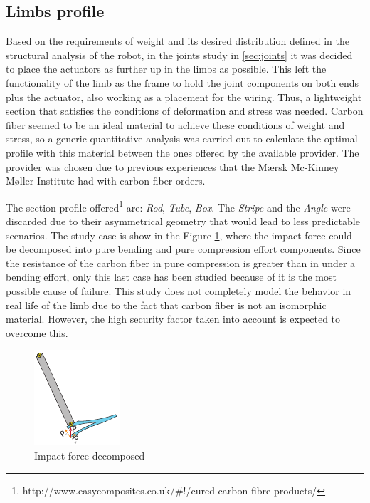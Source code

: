 \subsection{Limbs profile} %
\label{sub:limb_profile}
Based on the requirements of weight and its desired distribution defined in the structural analysis of the robot, in the joints study in \ref{sec:joints} it was decided to place the actuators as further up in the limbs as possible.
This left the functionality of the limb as the frame to hold the joint components on both ends plus the actuator, also working as a placement for the wiring.
Thus, a lightweight section that satisfies the conditions of deformation and stress was needed.
Carbon fiber seemed to be an ideal material to achieve these conditions of weight and stress, so a generic quantitative analysis was carried out to calculate the optimal profile with this material between the ones offered by the available provider.
The provider was chosen due to previous experiences that the Mærsk Mc-Kinney Møller Institute had with carbon fiber orders.

The section profile offered\footnote{http://www.easycomposites.co.uk/\#!/cured-carbon-fibre-products/} are: \textit{Rod}, \textit{Tube}, \textit{Box}. The \textit{Stripe} and the \textit{Angle} were discarded due to their asymmetrical geometry that would lead to less predictable scenarios.
The study case is show in the Figure \ref{fig:impact_decomposition}, where the impact force could be decomposed into pure bending and pure compression effort components.
Since the resistance of the carbon fiber in pure compression is greater than in under a bending effort, only this last case has been studied because of it is the most possible cause of failure.
This study does not completely model the behavior in real life of the limb due to the fact that carbon fiber is not an isomorphic material.
However, the high security factor taken into account is expected to overcome this.

\begin{figure}[ht!]
  \centering
  \includegraphics[width=.3\textwidth]{figures/impact_decomposition.pdf}
  \caption{Impact force decomposed}
  \label{fig:impact_decomposition}
\end{figure}

